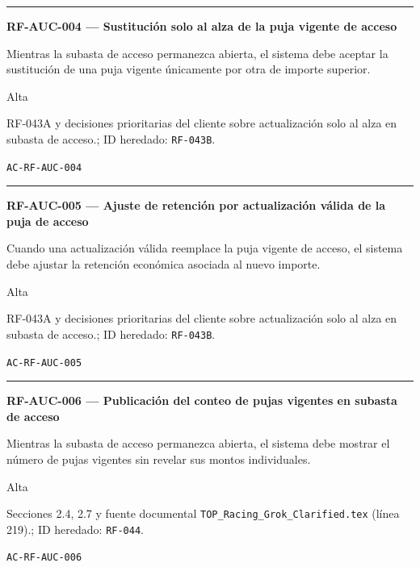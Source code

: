 \documentclass[10pt,letterpaper]{article}
\begin{document}
\vspace{0.25em}\hrule\vspace{0.65em}
\noindent\textbf{RF-AUC-004 --- Sustitución solo al alza de la puja vigente de acceso}\par
\begin{description}[style=nextline,leftmargin=3.15cm,labelwidth=2.8cm,font=\normalfont\bfseries]
\item[Obligación] Mientras la subasta de acceso permanezca abierta, el sistema debe aceptar la sustitución de una puja vigente únicamente por otra de importe superior.
\item[Prioridad] Alta
\item[Procedencia] RF-043A y decisiones prioritarias del cliente sobre actualización solo al alza en subasta de acceso.; ID heredado: \texttt{RF-043B}.
\item[Verificación] \texttt{AC-RF-AUC-004}
\end{description}
\vspace{0.25em}\hrule\vspace{0.65em}
\noindent\textbf{RF-AUC-005 --- Ajuste de retención por actualización válida de la puja de acceso}\par
\begin{description}[style=nextline,leftmargin=3.15cm,labelwidth=2.8cm,font=\normalfont\bfseries]
\item[Obligación] Cuando una actualización válida reemplace la puja vigente de acceso, el sistema debe ajustar la retención económica asociada al nuevo importe.
\item[Prioridad] Alta
\item[Procedencia] RF-043A y decisiones prioritarias del cliente sobre actualización solo al alza en subasta de acceso.; ID heredado: \texttt{RF-043B}.
\item[Verificación] \texttt{AC-RF-AUC-005}
\end{description}
\vspace{0.25em}\hrule\vspace{0.65em}
\noindent\textbf{RF-AUC-006 --- Publicación del conteo de pujas vigentes en subasta de acceso}\par
\begin{description}[style=nextline,leftmargin=3.15cm,labelwidth=2.8cm,font=\normalfont\bfseries]
\item[Obligación] Mientras la subasta de acceso permanezca abierta, el sistema debe mostrar el número de pujas vigentes sin revelar sus montos individuales.
\item[Prioridad] Alta
\item[Procedencia] Secciones 2.4, 2.7 y fuente documental \texttt{TOP\_Racing\_Grok\_Clarified.tex} (línea 219).; ID heredado: \texttt{RF-044}.
\item[Verificación] \texttt{AC-RF-AUC-006}
\end{description}
\end{document}
